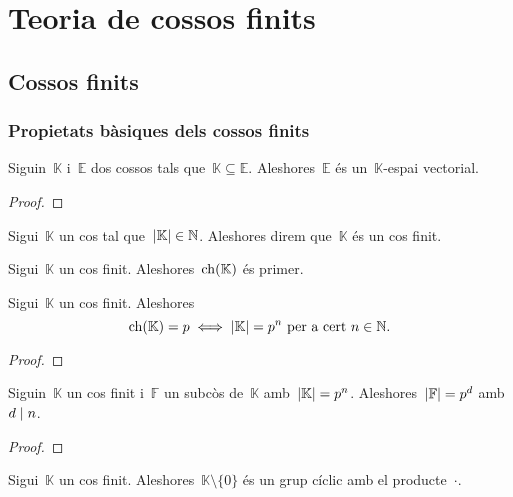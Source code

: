 \documentclass[../estructures-algebraiques.tex]{subfiles}
\begin{document}
\chapter{Teoria de cossos finits}
\section{Cossos finits}
    \subsection{Propietats bàsiques dels cossos finits}
    \begin{proposition}
        \label{prop:un-subcos-es-un-espai-vectorial}
        Siguin~\(\mathbb{K}\) i~\(\mathbb{E}\) dos cossos tals que~\(\mathbb{K}\subseteq\mathbb{E}\).
        Aleshores~\(\mathbb{E}\) és un~\(\mathbb{K}\)-espai vectorial.
    \end{proposition}
    \begin{proof}
    \end{proof}
    \begin{definition}
        \label{def:cos-finit}
        Sigui~\(\mathbb{K}\) un cos tal que~\(\abs{\mathbb{K}}\in\mathbb{N}\).
        Aleshores direm que~\(\mathbb{K}\) és un cos finit.
    \end{definition}
    \begin{observation}
        Sigui~\(\mathbb{K}\) un cos finit.
        Aleshores~\(\operatorname{ch}(\mathbb{K})\) és primer.
    \end{observation}
    \begin{theorem}
        Sigui~\(\mathbb{K}\) un cos finit.
        Aleshores
        \[
            \ch(\mathbb{K})=p\sii\abs{\mathbb{K}}=p^{n}\text{ per a cert }n\in\mathbb{N}.
        \]
    \end{theorem}
    \begin{proof}
    \end{proof}
    \begin{corollary}
        Siguin~\(\mathbb{K}\) un cos finit i~\(\mathbb{F}\) un subcòs de~\(\mathbb{K}\) amb~\(\abs{\mathbb{K}}=p^{n}\).
        Aleshores~\(\abs{\mathbb{F}}=p^{d}\) amb~\(d\mathrel{|} n\).
    \end{corollary}
    \begin{proof}
    \end{proof}
    \begin{theorem}
        \label{thm:teorema-de-lelement-primitiu}
        Sigui~\(\mathbb{K}\) un cos finit.
        Aleshores~\(\mathbb{K}\setminus\{0\}\) és un grup cíclic amb el producte~\(\cdot\).
    \end{theorem}
\end{document}
